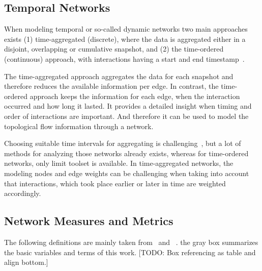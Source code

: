 \subsection{Temporal Networks}
When modeling temporal or so-called dynamic networks two main approaches exists (1) time-aggregated (discrete), where the data is aggregated either in a disjoint, overlapping or cumulative snapshot, and (2) the time-ordered (continuous) approach, with interactions having a start and end timestamp~\cite{moody2005dynamic, Pinter-Wollman2014, blonder2012temporal}.

The time-aggregated approach aggregates the data for each snapshot and therefore reduces the available information per edge. In contrast, the time-ordered approach keeps the information for each edge, when the interaction occurred and how long it lasted. It provides a detailed insight when timing and order of interactions are important.  And therefore it can be used to model the topological flow information through a network.

Choosing suitable time intervals for aggregating is challenging~\cite{Pinter-Wollman2014}, but a lot of methods for analyzing those networks already exists, whereas for time-ordered networks, only limit toolset is available. In time-aggregated networks, the modeling nodes and edge weights can be challenging when taking into account that interactions, which took place earlier or later in time are weighted accordingly.

\subsection{Network Measures and Metrics}
\label{sec:definitions}
The following definitions are mainly taken from~\textcite{barabasi2016network} and ~\textcite{newman2010networks}. the gray box summarizes the basic variables and terms of this work. [TODO: Box referencing as table and align bottom.]


